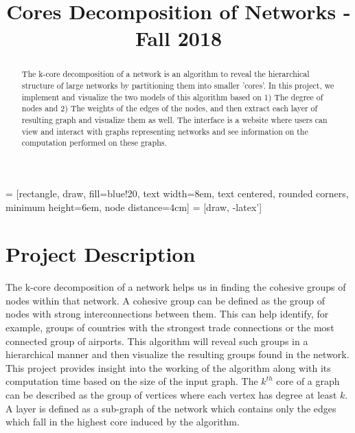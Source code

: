\documentclass[10pt,conference]{IEEEtran}
\begin{document}
 = [rectangle, draw, fill=blue!20, 
    text width=8em, text centered, rounded corners, minimum height=6em, node distance=4cm]
 = [draw, -latex']

\title{Cores Decomposition of Networks - Fall 2018}
\author{
}

\maketitle
\begin{abstract}
\textnormal{
The k-core decomposition of a network is an algorithm to reveal the hierarchical structure of large networks by partitioning them into smaller 'cores'. In this project, we implement and visualize the two models of this algorithm based on 1) The degree of nodes and 2) The weights of the edges of the nodes, and then extract each layer of resulting graph and visualize them as well. The interface is a website where users can view and interact with graphs representing networks and see information on the computation performed on these graphs.
}
\end{abstract}

\IEEEpeerreviewmaketitle
\section{Project Description}\label{sec:1. Project Description}
\textnormal{
The k-core decomposition of a network helps us in finding the cohesive groups of nodes within that network. A cohesive group can be defined as the group of nodes with strong interconnections between them. This can help identify, for example, groups of countries with the strongest trade connections or the most connected group of airports. This algorithm will reveal such groups in a hierarchical manner and then visualize the resulting groups found in the network. This project provides insight into the working of the algorithm along with its computation time based on the size of the input graph. The $k^{th}$ core of a graph can be described as the group of vertices where each vertex has degree at least $k$. A layer is defined as a sub-graph of the network which contains only the edges which fall in the highest core induced by the algorithm.\\
}
\end{document}
